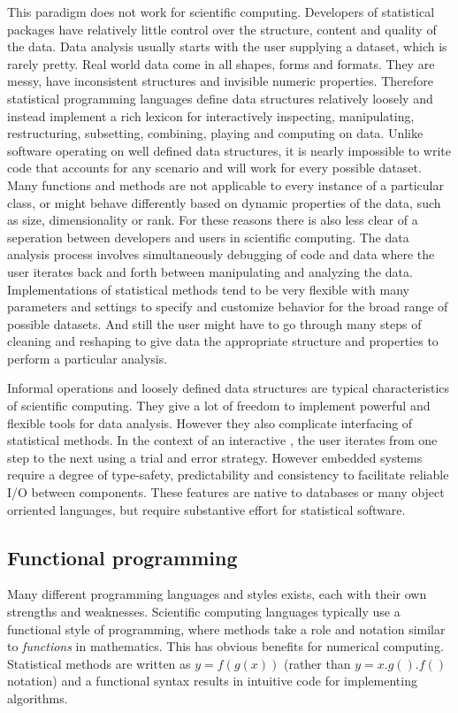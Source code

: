 This paradigm does not work for scientific computing. Developers of statistical packages have relatively little control over the structure, content and quality of the data. Data analysis usually starts with the user supplying a dataset, which is rarely pretty. Real world data come in all shapes, forms and formats. They are messy, have inconsistent structures and invisible numeric properties. Therefore statistical programming languages define data structures relatively loosely and instead implement a rich lexicon for interactively inspecting, manipulating, restructuring, subsetting, combining, playing and computing on data. Unlike software operating on well defined data structures, it is nearly impossible to write code that accounts for any scenario and will work for every possible dataset. Many functions and methods are not applicable to every instance of a particular class, or might behave differently based on dynamic properties of the data, such as size, dimensionality or rank. For these reasons there is also less clear of a seperation between developers and users in scientific computing. The data analysis process involves simultaneously debugging of code and data where the user iterates back and forth between manipulating and analyzing the data. Implementations of statistical methods tend to be very flexible with many parameters and settings to specify and customize behavior for the broad range of possible datasets. And still the user might have to go through many steps of cleaning and reshaping to give data the appropriate structure and properties to perform a particular analysis. 

Informal operations and loosely defined data structures are typical characteristics of scientific computing. They give a lot of freedom to implement powerful and flexible tools for data analysis. However they also complicate interfacing of statistical methods. In the context of an interactive \UI, the user iterates from one step to the next using a trial and error strategy. However embedded systems require a degree of type-safety, predictability and consistency to facilitate reliable I/O between components. These features are native to databases or many object orriented languages, but require substantive effort for statistical software. 


\subsection{Functional programming}

Many different programming languages and styles exists, each with their own strengths and weaknesses. Scientific computing languages typically use a functional style of programming, where methods take a role and notation similar to \emph{functions} in mathematics. This has obvious benefits for numerical computing. Statistical methods are written as $y = f(g(x))$ (rather than $y = x.g().f()$ notation) and a functional syntax results in intuitive code for implementing algorithms. 

